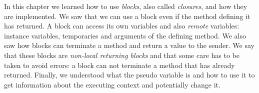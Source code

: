 \documentclass[a4paper,10pt,twoside]{book}
\begin{document}

In this chapter we learned how to use \emph{blocks}, also called
\emph{closures}, and how they are implemented. We saw that we can use
a block even if the method defining it has returned. A block can
access its own variables and also \emph{remote} variables: instance
variables, temporaries and arguments of the defining method. We also
saw how blocks can terminate a method and return a value to the
sender. We say that these blocks are \emph{non-local returning blocks}
and that some care has to be taken to avoid errors: a block can not
terminate a method that has already returned. Finally, we understood
what the  pseudo variable is and how to use it to get
information about the executing context and potentially change it.

\ifx\wholebook\relax\else
   
   
\end{document}
